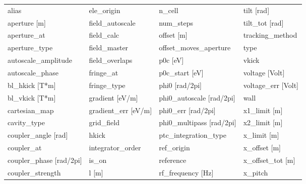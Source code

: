  \begin{tabular}{llll} \toprule
alias                            & ele_origin                       & n_cell                           & tilt [rad]                       \\
aperture [m]                     & field_autoscale                  & num_steps                        & tilt_tot [rad]                   \\
aperture_at                      & field_calc                       & offset [m]                       & tracking_method                  \\
aperture_type                    & field_master                     & offset_moves_aperture            & type                             \\
autoscale_amplitude              & field_overlaps                   & p0c [eV]                         & vkick                            \\
autoscale_phase                  & fringe_at                        & p0c_start [eV]                   & voltage [Volt]                   \\
bl_hkick [T*m]                   & fringe_type                      & phi0 [rad/2pi]                   & voltage_err [Volt]               \\
bl_vkick [T*m]                   & gradient [eV/m]                  & phi0_autoscale [rad/2pi]         & wall                             \\
cartesian_map                    & gradient_err [eV/m]              & phi0_err [rad/2pi]               & x1_limit [m]                     \\
cavity_type                      & grid_field                       & phi0_multipass [rad/2pi]         & x2_limit [m]                     \\
coupler_angle [rad]              & hkick                            & ptc_integration_type             & x_limit [m]                      \\
coupler_at                       & integrator_order                 & ref_origin                       & x_offset [m]                     \\
coupler_phase [rad/2pi]          & is_on                            & reference                        & x_offset_tot [m]                 \\
coupler_strength                 & l [m]                            & rf_frequency [Hz]                & x_pitch                          \\

\end{tabular}
